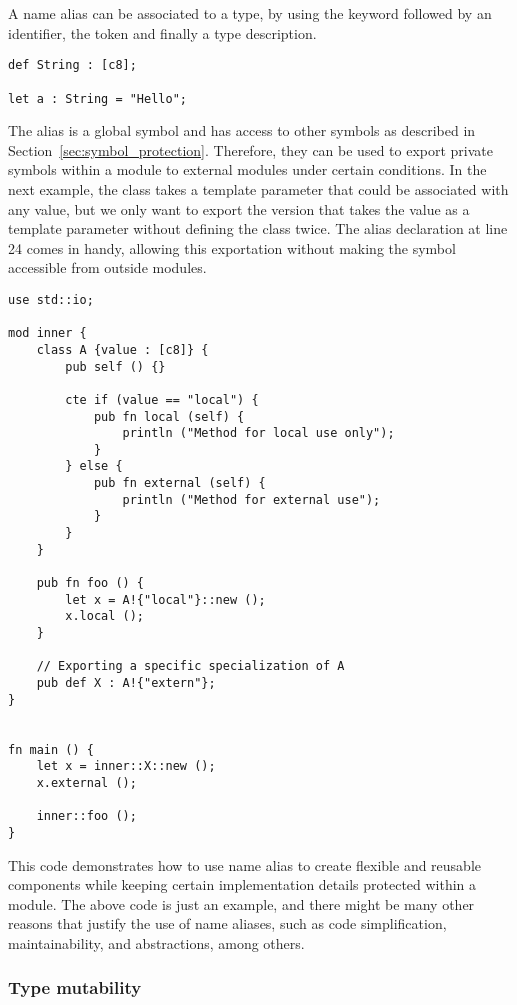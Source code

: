 A name alias can be associated to a type, by using the keyword 
followed by an identifier, the token \token{:} and finally a type description.

\begin{lstlisting}[style=coloredverbatim]
def String : [c8];

let a : String = "Hello";
\end{lstlisting}

The alias is a global symbol and has access to other symbols as described in
Section~\ref{sec:symbol_protection}. Therefore, they can be used to export
private symbols within a module to external modules under certain conditions. In
the next example, the class  takes a template parameter that could be
associated with any value, but we only want to export the version that takes the
value  as a template parameter without defining the class twice.
The alias declaration  at line 24 comes in handy, allowing this
exportation without making the symbol  accessible from outside modules.

\begin{lstlisting}[style=coloredverbatim]
use std::io;

mod inner {
    class A {value : [c8]} {
        pub self () {}

        cte if (value == "local") {
            pub fn local (self) {
                println ("Method for local use only");
            }
        } else {
            pub fn external (self) {
                println ("Method for external use");
            }
        }
    }

    pub fn foo () {
        let x = A!{"local"}::new ();
        x.local ();
    }

    // Exporting a specific specialization of A
    pub def X : A!{"extern"};
}


fn main () {
    let x = inner::X::new ();
    x.external ();

    inner::foo ();
}
\end{lstlisting}

This code demonstrates how to use name alias to create flexible and reusable
components while keeping certain implementation details protected within a
module. The above code is just an example, and there might be many other reasons
that justify the use of name aliases, such as code simplification,
maintainability, and abstractions, among others.

\subsubsection*{Type mutability}

